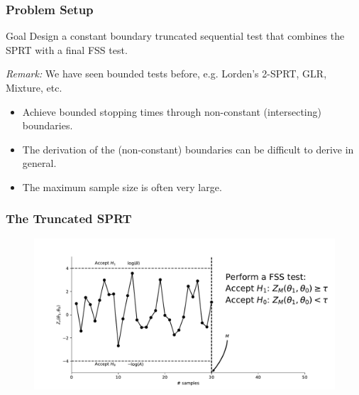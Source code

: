 \documentclass[10pt]{beamer}
\begin{document}
\begin{frame}
\frametitle{Problem Setup}

\begin{block}{Goal}
Design a constant boundary truncated sequential test that combines the SPRT with a final FSS test.
\end{block}

\textit{Remark:} We have seen bounded tests before, e.g. Lorden's 2-SPRT, GLR, Mixture, etc.
\begin{itemize}
\item Achieve bounded stopping times through non-constant (intersecting) boundaries.
\item The derivation of the (non-constant) boundaries can be difficult to derive in general.
\item The maximum sample size is often very large.
\end{itemize}


\end{frame}

\begin{frame}
\frametitle{The Truncated SPRT}

\begin{figure}
\centering
\includegraphics[width=\textwidth]{images/truncated_sprt}
\end{figure}

\end{frame}
\end{document}
